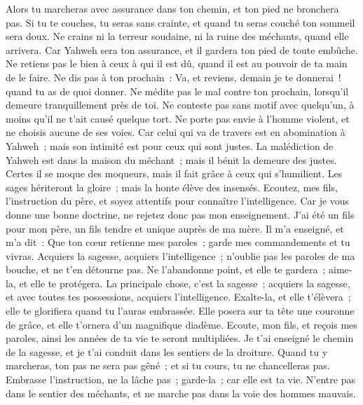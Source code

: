 \begin{multicols}{2}
Alors tu marcheras avec assurance dans ton chemin, et ton pied ne bronchera pas.
Si tu te couches, tu seras sans crainte, et quand tu seras couché ton sommeil sera doux.
Ne crains ni la terreur soudaine, ni la ruine des méchants, quand elle arrivera.
Car Yahweh sera ton assurance, et il gardera ton pied de toute embûche.
Ne retiens pas le bien à ceux à qui il est dû, quand il est au pouvoir de ta main de le faire.
Ne dis pas à ton prochain~: Va, et reviens, demain je te donnerai~! quand tu as de quoi donner.
Ne médite pas le mal contre ton prochain, lorsqu'il demeure tranquillement près de toi.
Ne conteste pas sans motif avec quelqu'un, à moins qu'il ne t'ait causé quelque tort.
Ne porte pas envie à l'homme violent, et ne choisis aucune de ses voies.
Car celui qui va de travers est en abomination à Yahweh~; mais son intimité est pour ceux qui sont justes.
La malédiction de Yahweh est dans la maison du méchant~; mais il bénit la demeure des justes.
Certes il se moque des moqueurs, mais il fait grâce à ceux qui s'humilient.
Les sages hériteront la gloire~; mais la honte élève des insensés.
\VerseOne{}Ecoutez, mes fils, l'instruction du père, et soyez attentifs pour connaître l'intelligence.
Car je vous donne une bonne doctrine, ne rejetez donc pas mon enseignement.
J'ai été un fils pour mon père, un fils tendre et unique auprès de ma mère.
Il m'a enseigné, et m'a dit~: Que ton cœur retienne mes paroles~; garde mes commandements et tu vivras.
Acquiers la sagesse, acquiers l'intelligence~; n'oublie pas les paroles de ma bouche, et ne t'en détourne pas.
Ne l'abandonne point, et elle te gardera~; aime-la, et elle te protégera.
La principale chose, c'est la sagesse~; acquiers la sagesse, et avec toutes tes possessions, acquiers l'intelligence.
Exalte-la, et elle t'élèvera~; elle te glorifiera quand tu l'auras embrassée.
Elle posera sur ta tête une couronne de grâce, et elle t'ornera d'un magnifique diadème.
Ecoute, mon fils, et reçois mes paroles, ainsi les années de ta vie te seront multipliées.
Je t'ai enseigné le chemin de la sagesse, et je t'ai conduit dans les sentiers de la droiture.
Quand tu y marcheras, ton pas ne sera pas gêné~; et si tu cours, tu ne chancelleras pas.
Embrasse l'instruction, ne la lâche pas~; garde-la~; car elle est ta vie.
N'entre pas dans le sentier des méchants, et ne marche pas dans la voie des hommes mauvais.

\end{multicols}
